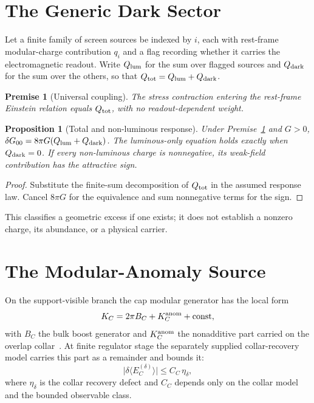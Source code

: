 \documentclass[11pt]{article}
\newtheorem{proposition}[theorem]{Proposition}
\newtheorem{premise}[theorem]{Premise}
\begin{document}
\section{The Generic Dark Sector}
\label{sec:generic}

Let a finite family of screen sources be indexed by \(i\), each with
rest-frame modular-charge contribution \(q_i\) and a flag recording whether
it carries the electromagnetic readout. Write \(Q_{\rm lum}\) for the sum over
flagged sources and \(Q_{\rm dark}\) for the sum over the others, so that
\(Q_{\rm tot}=Q_{\rm lum}+Q_{\rm dark}\).

\begin{premise}[Universal coupling]
\label{pre:universal}
The stress contraction entering the rest-frame Einstein relation equals
\(Q_{\rm tot}\), with no readout-dependent weight.
\end{premise}

\begin{proposition}[Total and non-luminous response]
\label{thm:all-charge}\label{thm:iff}\label{cor:excess}\label{prop:sign}
Under Premise~\ref{pre:universal} and \(G>0\),
\(\delta G_{00}=8\pi G(Q_{\rm lum}+Q_{\rm dark})\).
The luminous-only equation holds exactly when \(Q_{\rm dark}=0\).
If every non-luminous charge is nonnegative, its weak-field contribution
has the attractive sign.
\end{proposition}
\begin{proof}
Substitute the finite-sum decomposition of \(Q_{\rm tot}\) in the assumed
response law. Cancel \(8\pi G\) for the equivalence and sum nonnegative
terms for the sign.
\end{proof}
This classifies a geometric excess if one exists; it does not establish a
nonzero charge, its abundance, or a physical carrier.

\section{The Modular-Anomaly Source}
\label{sec:source}

On the support-visible branch the cap modular generator has the local form
\begin{equation}
K_C=2\pi B_C+K_C^{\rm anom}+\mathrm{const},
\label{eq:split}
\end{equation}
with \(B_C\) the bulk boost generator and \(K_C^{\rm anom}\) the nonadditive
part carried on the overlap collar~\cite{ophEinstein}. At finite regulator
stage the separately supplied collar-recovery model carries this part as a
remainder and bounds it:
\begin{equation}
\bigl|\delta\langle E_C^{(\delta)}\rangle\bigr|\le C_C\,\eta_\delta,
\label{eq:bound}
\end{equation}
where \(\eta_\delta\) is the collar recovery defect and \(C_C\) depends only
on the collar model and the bounded observable class.
\end{document}
